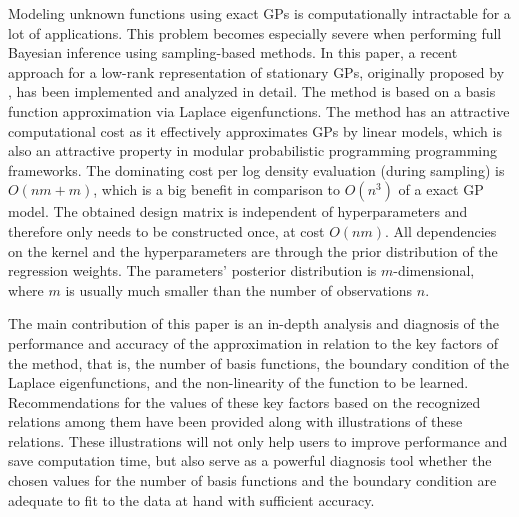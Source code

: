 \documentclass[onecolumn,a4paper,11pt]{article}
\begin{document}
Modeling unknown functions using exact GPs is computationally intractable for a lot of applications. This problem becomes especially severe when performing full Bayesian inference using sampling-based methods. In this paper, a recent approach for a low-rank representation of stationary GPs, originally proposed by \citet{solin2018hilbert}, has been implemented and analyzed in detail. The method is based on a basis function approximation via Laplace eigenfunctions. The method has an attractive computational cost as it effectively approximates GPs by linear models, which is also an attractive property in modular probabilistic programming programming frameworks. The dominating cost per log density evaluation (during sampling) is $O(nm+m)$, which is a big benefit in comparison to $O(n^3)$ of a exact GP model. The obtained design matrix is independent of hyperparameters and therefore only needs to be constructed once, at cost $O(nm)$. All dependencies on the kernel and the hyperparameters are through the prior distribution of the regression weights. The parameters' posterior distribution is $m$-dimensional, where $m$ is usually much smaller than the number of observations $n$. 


The main contribution of this paper is an in-depth analysis and diagnosis of the performance and accuracy of the approximation in relation to the key factors of the method, that is, the number of basis functions, the boundary condition of the Laplace eigenfunctions, and the non-linearity of the function to be learned. Recommendations for the values of these key factors based on the recognized relations among them have been provided along with illustrations of these relations. These illustrations will not only help users to improve performance and save computation time, but also serve as a powerful diagnosis tool whether the chosen values for the number of basis functions and the boundary condition are adequate to fit to the data at hand with sufficient accuracy.
\end{document}
